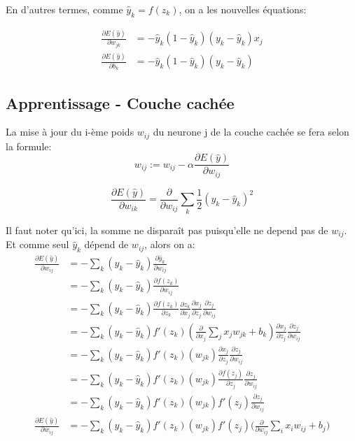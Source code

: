 \documentclass{article}
\begin{document}
En d'autres termes, comme $\hat{y}_k=f(z_k)$, on a les nouvelles équations:

\begin{align*}\frac{\partial{E(\hat{y})}}{\partial{w_{jk}}}&=-\hat{y}_k(1-\hat{y}_k)(y_k-\hat{y}_k)x_j\\
\frac{\partial{E(\hat{y})}}{\partial{b_k}}&=-\hat{y}_k(1-\hat{y}_k)(y_k-\hat{y}_k)
\end{align*}

\newpage

\subsection{Apprentissage - Couche cachée}

La mise à jour du i-ème poids $w_{ij}$ du neurone j de la couche cachée se fera selon la formule: 
\begin{equation}
w_{ij}:=w_{ij}-\alpha\frac{\partial{E(\hat{y})}}{\partial{w_{ij}}}
\end{equation}

\begin{equation}
\frac{\partial{E(\hat{y})}}{\partial{w_{ik}}}=\frac{\partial{}}{\partial{w_{ij}}}\sum_k{\frac{1}{2}(y_k-\hat{y}_k)^2}
\end{equation}

Il faut noter qu'ici, la somme ne disparaît pas puisqu'elle ne depend pas de $w_{ij}$. Et comme seul $\hat{y}_k$ dépend de $w_{ij}$, alors on a:
\begin{align*}
\frac{\partial{E(\hat{y})}}{\partial{w_{ij}}}&=-\sum_k{(y_k-\hat{y}_k)\frac{\partial{\hat{y}_k}}{\partial{w_{ij}}}}\\
&=-\sum_k{(y_k-\hat{y}_k)\frac{\partial{f(z_k)}}{\partial{w_{ij}}}}\\
&=-\sum_k{(y_k-\hat{y}_k)\frac{\partial{f(z_k)}}{\partial{z_k}}\frac{\partial{z_k}}{\partial{x_j}}\frac{\partial{x_j}}{\partial{z_j}}\frac{\partial{z_j}}{\partial{w_{ij}}}}\\
&=-\sum_k{(y_k-\hat{y}_k){f'(z_k)}(\frac{\partial{}}{\partial{x_j}}\sum_j{{x_j}w_{jk}}+b_k)\frac{\partial{x_j}}{\partial{z_j}}\frac{\partial{z_j}}{\partial{w_{ij}}}}\\
&=-\sum_k{(y_k-\hat{y}_k){f'(z_k)}(w_{jk})\frac{\partial{x_j}}{\partial{z_j}}\frac{\partial{z_j}}{\partial{w_{ij}}}}\\
&=-\sum_k{(y_k-\hat{y}_k){f'(z_k)}(w_{jk})\frac{\partial{f(z_j)}}{\partial{z_j}}\frac{\partial{z_j}}{\partial{w_{ij}}}}\\
&=-\sum_k{(y_k-\hat{y}_k){f'(z_k)}(w_{jk}){f'(z_j)}\frac{\partial{z_j}}{\partial{w_{ij}}}}\\
\frac{\partial{E(\hat{y})}}{\partial{w_{ij}}}&=-\sum_k{(y_k-\hat{y}_k){f'(z_k)}(w_{jk}){f'(z_j)}(\frac{\partial{}}{\partial{w_{ij}}}}\sum_i{{x_i}w_{ij}}+b_j)
\end{align*}
\end{document}
